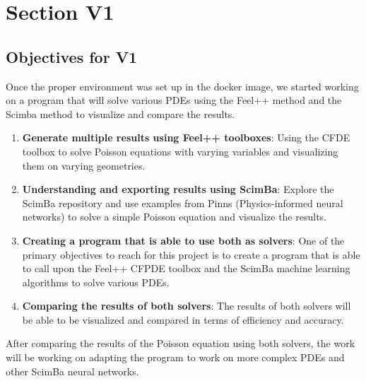\documentclass[12pt]{article}
\begin{document}
\newpage

\section{Section V1}
\label{sec:Section V1}


\newpage

\subsection{Objectives for V1}

Once the proper environment was set up in the docker image, we started working on a
program that will solve various PDEs using the Feel++ method and the Scimba method to
visualize and compare the results.


\begin{enumerate}
    \item \textbf{Generate multiple results using Feel++ toolboxes}: Using the CFDE toolbox to solve Poisson equations with varying variables and visualizing them on varying geometries.
    
    \item \textbf{Understanding and exporting results using ScimBa}: Explore the ScimBa repository and use examples from Pinns (Physics-informed neural networks) to solve a simple Poisson equation and visualize the results.
    
    \item \textbf{Creating a program that is able to use both as solvers}: One of the primary objectives to reach for this project is to create a program that is able to call upon the Feel++ CFPDE toolbox and the ScimBa machine learning algorithms to solve various PDEs.
    
    \item \textbf{Comparing the results of both solvers}: The results of both solvers will be able to be visualized and compared in terms of efficiency and accuracy.
\end{enumerate}

After comparing the results of the Poisson equation using both solvers, the work will be working on adapting the program to work on more complex PDEs and other ScimBa neural networks.
\end{document}
